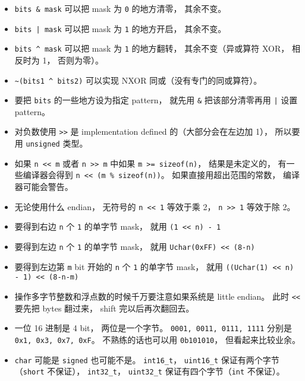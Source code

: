 
\begin{issues}
\issueDraft
\end{issues}

\begin{itemize}
\item \verb|bits & mask| 可以把 mask 为 \verb|0| 的地方清零， 其余不变。
\item \verb`bits | mask` 可以把 mask 为 \verb|1| 的地方开启， 其余不变。
\item \verb|bits ^ mask| 可以把 mask 为 \verb|1| 的地方翻转， 其余不变（异或算符 XOR， 相反时为 1， 否则为零）。
\item \verb|~(bits1 ^ bits2)| 可以实现 NXOR 同或（没有专门的同或算符）。
\item 要把 \verb|bits| 的一些地方设为指定 pattern， 就先用 \verb|&| 把该部分清零再用 \verb`|` 设置 pattern。
\item 对负数使用 \verb|>>| 是 implementation defined 的（大部分会在左边加 1）， 所以要用 \verb|unsigned| 类型。
\item 如果 \verb|n << m| 或者 \verb|n >> m| 中如果 \verb|m >= sizeof(n)|， 结果是未定义的， 有一些编译器会得到 \verb|n << (m % sizeof(n))|。 如果直接用超出范围的常数， 编译器可能会警告。
\item 无论使用什么 endian， 无符号的 \verb|n << 1| 等效于乘 2， \verb|n >> 1| 等效于除 2。
\item 要得到右边 \verb|n| 个 \verb|1| 的单字节 mask， 就用 \verb|(1 << n) - 1|
\item 要得到左边 \verb|n| 个 \verb|1| 的单字节 mask， 就用 \verb|Uchar(0xFF) << (8-n)|
\item 要得到左边第 \verb|m| bit 开始的 \verb|n| 个 \verb|1| 的单字节 mask， 就用 \verb|((Uchar(1) << n) - 1) << (8-n-m)|
\item 操作多字节整数和浮点数的时候千万要注意如果系统是 little endian。 此时 \verb|<<| 要先把 bytes 翻过来， shift 完以后再次翻回去。
\item 一位 16 进制是 4 bit， 两位是一个字节。 \verb|0001, 0011, 0111, 1111| 分别是 \verb|0x1, 0x3, 0x7, 0xF|。 不熟练的话也可以用 \verb|0b101010|， 但看起来比较业余。
\item \verb|char| 可能是 \verb|signed| 也可能不是。 \verb|int16_t|， \verb|uint16_t| 保证有两个字节（\verb|short| 不保证）， \verb|int32_t|， \verb|uint32_t| 保证有四个字节（\verb|int| 不保证）。
\end{itemize}
